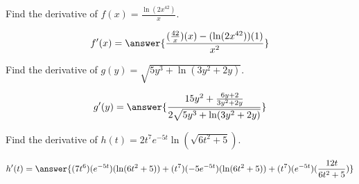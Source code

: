 \documentclass{ximera}
\author{Bobby Ramsey}
\begin{document}
\begin{exercise}
	Find the derivative of $\displaystyle f(x) = \frac{\ln(2x^{42})}{x}$.
	
	\[ f'(x) = \answer{\frac{(\frac{42}{x})(x)-(\ln(2x^{42}))(1)}{x^2}} \]
\end{exercise}

\begin{exercise}
	Find the derivative of $\displaystyle g(y) = \sqrt{5y^3+\ln(3y^2+2y)}$.

	\[ g'(y) = \answer{\frac{15y^2 + \frac{6y+2}{3y^2+2y}}{2\sqrt{5y^3+\ln(3y^2+2y)}}  }\]
\end{exercise}

\begin{exercise}
	Find the derivative of $\displaystyle h(t) = 2t^7e^{-5t}\ln(\sqrt{6t^2+5})$.
	
	\[ h'(t) = \answer{    (7t^6)(e^{-5t})(\ln(6t^2+5))+(t^7)(-5e^{-5t})(\ln(6t^2+5))+(t^7)(e^{-5t})(\frac{12t}{6t^2+5})   }\]
\end{exercise}
\end{document}
